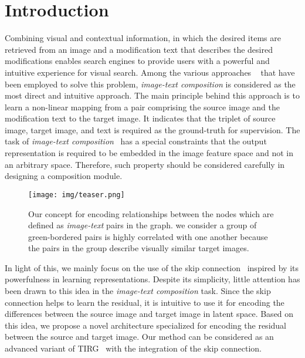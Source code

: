 \documentclass[10pt,twocolumn,letterpaper]{article}
\begin{document}
\section{Introduction}
Combining visual and contextual information, in which the desired items are retrieved from an image and a modification text that describes the desired modifications enables search engines to provide users with a powerful and intuitive experience for visual search.
Among the various approaches ~\cite{shin2019semi,zhao2017memory,ak2018learning} that have been employed to solve this problem, \textit{image-text composition} is considered as the most direct and intuitive approach.
The main principle behind this approach is to learn a non-linear mapping from a pair comprising the source image and the modification text to the target image. It indicates that the triplet of source image, target image, and text is required as the ground-truth for supervision.
The task of \textit{image-text composition}~\cite{anwaar2020compositional,vo2019composing,shin2020fashion,chen2020image,chen2020learning,jandial2020trace} has a special constraints that the output representation is required to be embedded in the image feature space and not in an arbitrary space. 
Therefore, such property should be considered carefully in designing a composition module.

\begin{figure}[t]
    \begin{center}
	    \texttt{[image: img/teaser.png]}
	\end{center}
	\caption{Our concept for encoding relationships between the nodes which are defined as \textit{image-text} pairs in the graph. we consider a group of green-bordered pairs is highly correlated with one another because the pairs in the group describe visually similar target images.}
	\label{fig:teaser}
\end{figure}

In light of this, we mainly focus on the use of the skip connection~\cite{he2016deep} inspired by its powerfulness in learning representations. Despite its simplicity, little attention has been drawn to this idea in the \textit{image-text composition} task. Since the skip connection helps to learn the residual, it is intuitive to use it for encoding the differences between the source image and target image in latent space. Based on this idea, we propose a novel architecture specialized for encoding the residual between the source and target image. Our method can be considered as an advanced variant of TIRG~\cite{vo2019composing} with the integration of the skip connection.
\end{document}
